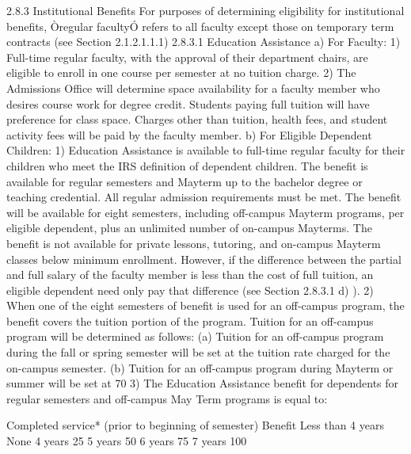 \documentclass[letterpaper, 11pt]{article}
\begin{document}
2.8.3 Institutional Benefits
   For purposes of determining eligibility for institutional benefits, Òregular facultyÓ refers to all faculty except those on temporary term contracts (see Section 2.1.2.1.1.1)
2.8.3.1 Education Assistance
a) For Faculty:
1) Full-time regular faculty, with the approval of their department chairs, are eligible to enroll in one course per semester at no tuition charge.
2) The Admissions Office will determine space availability for a faculty member who desires course work for degree credit.  Students paying full tuition will have preference for class space.  Charges other than tuition, health fees, and student activity fees will be paid by the faculty member.
b) For Eligible Dependent Children:
1) Education Assistance is available to full-time regular faculty for their children who meet the IRS definition of dependent children.  The benefit is available for regular semesters and Mayterm up to the bachelor degree or teaching credential. All regular admission requirements must be met.  The benefit will be available for eight semesters, including off-campus Mayterm programs, per eligible dependent, plus an unlimited number of on-campus Mayterms.  The benefit is not available for private lessons, tutoring, and on-campus Mayterm classes below minimum enrollment.  However, if the difference between the partial and full salary of the faculty member is less than the cost of full tuition, an eligible dependent need only pay that difference (see Section 2.8.3.1 d) ).
2) When one of the eight semesters of benefit is used for an off-campus program, the benefit covers the tuition portion of the program.  Tuition for an off-campus program will be determined as follows:
(a) Tuition for an off-campus program during the fall or spring semester will be set at the tuition rate charged for the on-campus semester.
(b) Tuition for an off-campus program during Mayterm or summer will be set at 70%
3) The Education Assistance benefit for dependents for regular semesters and off-campus May Term programs is equal to:

Completed service* (prior to beginning of semester)
Benefit
Less than 4 years
None
4 years
25%
5 years
50%
6 years
75%
7 years
100%
\end{document}
